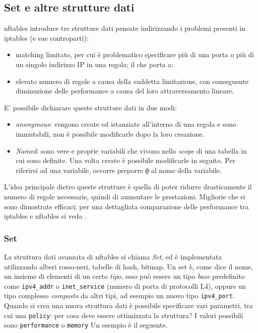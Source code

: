 \subsection{Set e altre strutture dati}
nftables introduce tre strutture dati pensate indirizzando i problemi
presenti in iptables (e sue controparti):
\begin{itemize}
	\item matching limitato, per cui è problematico specificare più di una porta
	      o più di un singolo indirizzo IP in una regola; il che porta a:
	\item elevato numero di regole a causa della suddetta limitazione, con conseguente
	diminuzione delle performance a causa del loro attraversamento lineare.
\end{itemize}
E' possibile dichiarare queste strutture dati in due modi:
\begin{itemize}
	\item \textit{anonymous}: vengono create ed istanziate all'interno di una regola
	      e sono immutabili, non è possibile modificarle dopo la loro creazione.
	\item \textit{Named}: sono vere e proprie variabili che vivono nello \textit{scope}
	      di una tabella in cui sono definite. Una volta create è possibile modificarle
	      in seguito. Per riferirsi ad una variabile, occorre preporre \texttt{@} al nome
	      della variabile.
\end{itemize}
L'idea principale dietro queste strutture è quella di poter
ridurre drasticamente il numero di regole necessarie, quindi di aumentare
le prestazioni. Migliorie che si sono
dimostrate efficaci; per una dettagliata comparazione delle performance tra
iptables e nftables si veda \cite{nftables-iptables-thesis}.

\subsubsection{Set}
La struttura dati avanzata di nftables si chiama \textit{Set}, ed è implementata
utilizzando alberi rosso-neri, tabelle di hash, bitmap.
Un set è, come dice il nome, un insieme di elementi di un certo \textit{tipo},
esso può essere un tipo \textit{base} predefinito come \texttt{ipv4\_addr} o
\texttt{inet\_service} (numero di porta di protocolli L4), oppure un tipo complesso
\textit{composto} da altri tipi, ad esempio un nuovo tipo \texttt{ipv4\_port}.
Quando si crea una nuova struttura dati è possibile specificare vari parametri,
tra cui una \texttt{policy}: per cosa deve essere ottimizzata la struttura?
I valori possibili sono \texttt{performance} o \texttt{memory}
Un esempio è il seguente.

